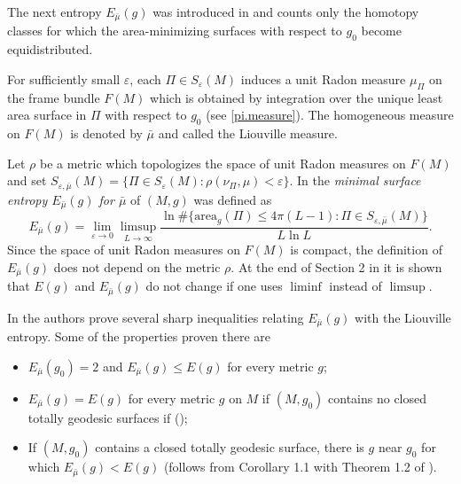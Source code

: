 \documentclass[11pt]{amsart}
\theoremstyle{remark}
\theoremstyle{definition}
\begin{document}
	{The next entropy $E_{\bar\mu}(g)$  was introduced in \cite{marques-neves-conf} and counts only the homotopy classes for which the area-minimizing surfaces with respect to $g_0$ become equidistributed. 
 
	
	For sufficiently small $\varepsilon$, each $\Pi\in  S_{\varepsilon}(M)$ induces  a  unit Radon measure $\mu_\Pi$ on the frame bundle $F(M)$ which is obtained by integration over the unique least area surface in $\Pi$ with respect to $g_0$ (see \eqref{pi.measure}). The homogeneous measure on $F(M)$ is denoted by $\bar\mu$ and called the Liouville measure.
	
	Let $\rho$ be a metric  which topologizes   the space of unit Radon measures on $F(M)$ and set ${S}_{\varepsilon,\bar\mu}(M)=\{\Pi\in S_\varepsilon(M): \rho(\nu_\Pi,\mu)<\varepsilon\}$. In \cite{marques-neves-conf} the {\em minimal surface entropy $E_{\bar\mu}(g)$ for $\bar\mu$}  of $(M,g)$  was defined as 
\begin{equation}\label{asymp.area}
E_{\bar\mu}(g)=\lim_{\varepsilon\to 0}\limsup_{L\to\infty} \frac{\ln \#\{\text{area}_g(\Pi)\leq 4\pi(L-1):\Pi\in S_{\varepsilon,\bar\mu}(M)\}}{L\ln L}.
\end{equation} 
Since the space of unit Radon measures on $F(M)$ is compact, the definition of $E_{\bar\mu}(g)$ does not depend on the metric $\rho$.  At the end of Section 2 in \cite{marques-neves-conf} it is shown that $E(g)$ and $E_{\bar\mu}(g)$   do not change if one uses $\liminf$ instead of $\limsup$.  

In  \cite{marques-neves-conf} the authors prove several sharp inequalities relating $E_{\bar\mu}(g)$  with the Liouville entropy. Some of the properties proven there are
\begin{itemize}
\item   $E_{\bar\mu}(g_0)=2$ and $E_{\bar\mu}(g)\leq E(g)$ for every metric $g$;
\item $E_{\bar\mu}(g)=E(g)$ for every metric $g$ on $M$ if $(M,g_0)$ contains no closed totally geodesic surfaces if (\cite[Proposition 5.1]{marques-neves-conf});
\item If $(M,g_0)$ contains a closed totally geodesic surface, there is $g$ near  $g_0$ for which $E_{\bar\mu}(g)<E(g)$ (follows from Corollary 1.1 with Theorem 1.2 of  \cite{marques-neves-conf}).
\end{itemize}



	
	
	
	
	
	
}
\end{document}
